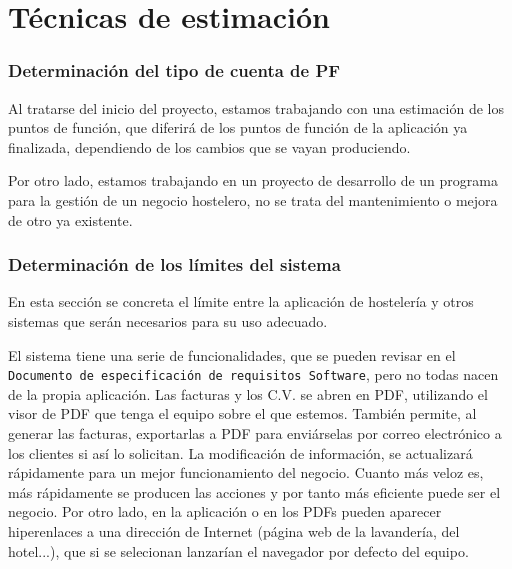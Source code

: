 \documentclass[spanish,a4paper,11pt, twoside]{report}	%
\begin{document}
\part{Técnicas de estimación} %
\section{Determinación del tipo de cuenta de PF}
Al tratarse del inicio del proyecto, estamos trabajando con una estimación de los puntos de función, que diferirá de los puntos de función de la aplicación ya finalizada, dependiendo de los cambios que se vayan produciendo. 

Por otro lado, estamos trabajando en un proyecto de desarrollo de un programa para la gestión de un negocio hostelero, no se trata del mantenimiento o mejora de otro ya existente.

\section{Determinación de los límites del sistema}
En esta sección se concreta el límite entre la aplicación de hostelería y otros sistemas que serán necesarios para su uso adecuado.

El sistema tiene una serie de funcionalidades, que se pueden revisar en el \texttt{Documento de especificación de requisitos Software}, pero no todas nacen de la propia aplicación. Las facturas y los C.V. se abren en PDF, utilizando el visor de PDF que tenga el equipo sobre el que estemos. También permite, al generar las facturas, exportarlas a PDF para enviárselas por correo electrónico a los clientes si así lo solicitan. La modificación de información, se actualizará rápidamente para un mejor funcionamiento del negocio. Cuanto más veloz es, más rápidamente se producen las acciones y por tanto más eficiente puede ser el negocio.
Por otro lado, en la aplicación o en los PDFs pueden aparecer hiperenlaces a una dirección de Internet (página web de la lavandería, del hotel...), que si se selecionan lanzarían el navegador por defecto del equipo.
\end{document}
